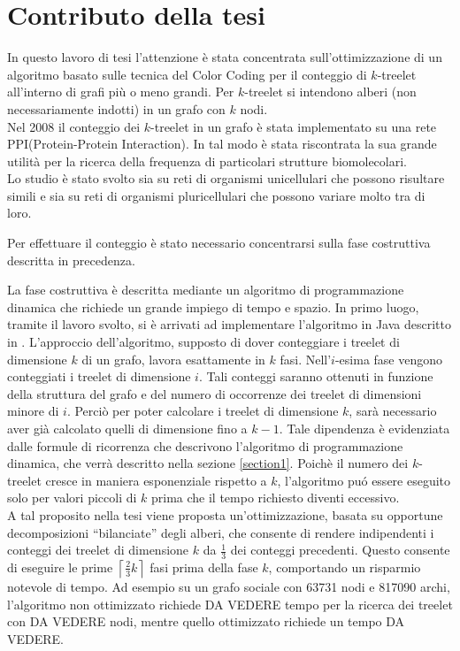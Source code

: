 \section{Contributo della tesi}

In questo lavoro di tesi l'attenzione \`e stata concentrata  sull'ottimizzazione di un algoritmo basato sulle tecnica del Color Coding per il conteggio di $k$-treelet all'interno di grafi pi\`u o meno grandi.
Per $ k $-treelet  si intendono alberi (non necessariamente indotti) in un grafo con $ k $ nodi.\\
Nel 2008 il conteggio dei $ k $-treelet in un grafo \`e stata implementato su una rete PPI(Protein-Protein Interaction). In tal modo \`e stata riscontrata la sua grande utilit\`a per la ricerca della frequenza di particolari strutture biomolecolari.\\
Lo studio \`e stato svolto sia su reti di organismi unicellulari che possono risultare simili e sia su reti di organismi pluricellulari che possono variare molto tra di loro.

Per effettuare il conteggio \`e stato necessario concentrarsi sulla fase costruttiva descritta in precedenza.

La fase costruttiva \`e descritta mediante un algoritmo di programmazione dinamica che richiede un grande impiego di tempo e spazio.
In primo luogo, tramite il lavoro svolto, si \`e arrivati ad implementare l'algoritmo in Java descritto in  \cite{bressan2018motif}.
L'approccio dell'algoritmo, supposto di dover conteggiare i treelet di dimensione $ k $ di un grafo, lavora esattamente  in $ k $ fasi.
Nell'$ i $-esima fase vengono conteggiati i treelet di dimensione $ i $.
Tali conteggi saranno ottenuti in funzione della struttura del grafo e del numero di occorrenze dei treelet di dimensioni minore di $ i $.
Perci\`o per poter calcolare i treelet di dimensione $ k $, sar\`a necessario aver gi\`a calcolato quelli di dimensione fino a $ k-1 $.
Tale dipendenza \`e evidenziata dalle formule di ricorrenza che descrivono l'algoritmo di programmazione dinamica, che verr\`a descritto nella sezione \ref{section1}.
Poich\`e il numero dei $ k $-treelet cresce in maniera esponenziale rispetto a $ k $, l'algoritmo pu\'o essere eseguito solo per valori piccoli di $ k $ prima che il tempo richiesto diventi eccessivo.\\
A tal proposito nella tesi viene proposta un'ottimizzazione, basata su opportune decomposizioni ``bilanciate'' degli alberi, che consente di rendere indipendenti i conteggi dei treelet di dimensione $ k $ da $\frac{1}{3}$ dei conteggi precedenti.
Questo consente di eseguire le prime $\left\lceil \frac{2}{3} k\right\rceil$  fasi prima della fase $ k $, comportando un risparmio notevole di tempo.
Ad esempio su un grafo sociale con 63731 nodi e 817090 archi, l'algoritmo non ottimizzato richiede DA VEDERE tempo per la ricerca dei treelet con DA VEDERE nodi, mentre quello ottimizzato richiede un tempo DA VEDERE.



